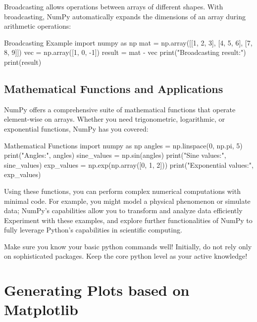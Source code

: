 Broadcasting allows operations between arrays of different shapes. With broadcasting, NumPy automatically expands the dimensions of an array during arithmetic operations:

\begin{codeonly}{Broadcasting Example}
import numpy as np
mat = np.array([[1, 2, 3],
                [4, 5, 6],
                [7, 8, 9]])
vec = np.array([1, 0, -1])
result = mat - vec
print("Broadcasting result:")
print(result)
\end{codeonly}

%
\subsection{Mathematical Functions and Applications}

NumPy offers a comprehensive suite of mathematical functions that operate element-wise on arrays. Whether you need trigonometric, logarithmic, or exponential functions, NumPy has you covered:

\begin{codeonly}{Mathematical Functions}
import numpy as np
angles = np.linspace(0, np.pi, 5)
print("Angles:", angles)
sine_values = np.sin(angles)
print("Sine values:", sine_values)
exp_values = np.exp(np.array([0, 1, 2]))
print("Exponential values:", exp_values)
\end{codeonly}

Using these functions, you can perform complex numerical computations with minimal code. For example, you might model a physical phenomenon or simulate data; NumPy’s capabilities allow you to transform and analyze data efficiently Experiment with these examples, and explore further functionalities of NumPy to fully leverage Python's capabilities in scientific computing.

\begin{recommendationbox}
Make sure you know your basic python commands well! Initially, do not rely only on sophisticated packages. Keep the core python level as your active knowledge!
\end{recommendationbox}

%
\section{Generating Plots based on Matplotlib}

